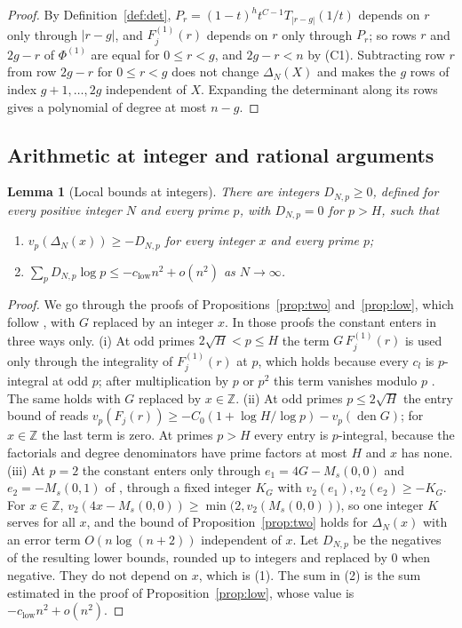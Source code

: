 \documentclass[11pt]{article}
\newtheorem{lemma}[theorem]{Lemma}
\theoremstyle{definition}
\begin{document}
\begin{proof}
By Definition~\ref{def:det}, $P_r=(1-t)^ht^{C-1}T_{|r-g|}(1/t)$ depends on $r$ only through $|r-g|$, and $F^{(1)}_j(r)$ depends on $r$ only through $P_r$; so rows $r$ and $2g-r$ of $\Phi^{(1)}$ are equal for $0\le r<g$, and $2g-r<n$ by (C1). Subtracting row $r$ from row $2g-r$ for $0\le r<g$ does not change $\Delta_N(X)$ and makes the $g$ rows of index $g+1,\dots,2g$ independent of $X$. Expanding the determinant along its rows gives a polynomial of degree at most $n-g$.
\end{proof}

\subsection{Arithmetic at integer and rational arguments}\label{xsec:arith}

\begin{lemma}[Local bounds at integers]\label{xlem:local}
There are integers $D_{N,p}\ge0$, defined for every positive integer $N$ and every prime $p$, with $D_{N,p}=0$ for $p>H$, such that
\begin{enumerate}
\item $v_p(\Delta_N(x))\ge-D_{N,p}$ for every integer $x$ and every prime $p$;
\item $\sum_pD_{N,p}\log p\le-c_{\mathrm{low}}n^2+o(n^2)$ as $N\to\infty$.
\end{enumerate}
\end{lemma}

\begin{proof}
We go through the proofs of Propositions~\ref{prop:two} and~\ref{prop:low}, which follow \cite[Secs.~2.2 and~3]{OAI}, with $G$ replaced by an integer $x$. In those proofs the constant enters in three ways only.
(i) At odd primes $2\sqrt H<p\le H$ the term $G\,F^{(1)}_j(r)$ is used only through the integrality of $F^{(1)}_j(r)$ at $p$, which holds because every $c_l$ is $p$-integral at odd $p$; after multiplication by $p$ or $p^2$ this term vanishes modulo $p$ \cite[Sec.~3.2, Lemmas~3.2, 3.3]{OAI}. The same holds with $G$ replaced by $x\in\mathbb Z$.
(ii) At odd primes $p\le2\sqrt H$ the entry bound of \cite[Sec.~3.4]{OAI} reads $v_p(F_j(r))\ge-C_0(1+\log H/\log p)-v_p(\operatorname{den}G)$; for $x\in\mathbb Z$ the last term is zero. At primes $p>H$ every entry is $p$-integral, because the factorials and degree denominators have prime factors at most $H$ and $x$ has none.
(iii) At $p=2$ the constant enters only through $e_1=4G-M_s(0,0)$ and $e_2=-M_s(0,1)$ of \cite[Eq.~(24)]{OAI}, through a fixed integer $K_G$ with $v_2(e_1),v_2(e_2)\ge-K_G$. For $x\in\mathbb Z$, $v_2(4x-M_s(0,0))\ge\min\big(2,v_2(M_s(0,0))\big)$, so one integer $K$ serves for all $x$, and the bound of Proposition~\ref{prop:two} holds for $\Delta_N(x)$ with an error term $O(n\log(n+2))$ independent of $x$.
Let $D_{N,p}$ be the negatives of the resulting lower bounds, rounded up to integers and replaced by $0$ when negative. They do not depend on $x$, which is (1). The sum in (2) is the sum estimated in the proof of Proposition~\ref{prop:low}, whose value is $-c_{\mathrm{low}}n^2+o(n^2)$.
\end{proof}
\end{document}
